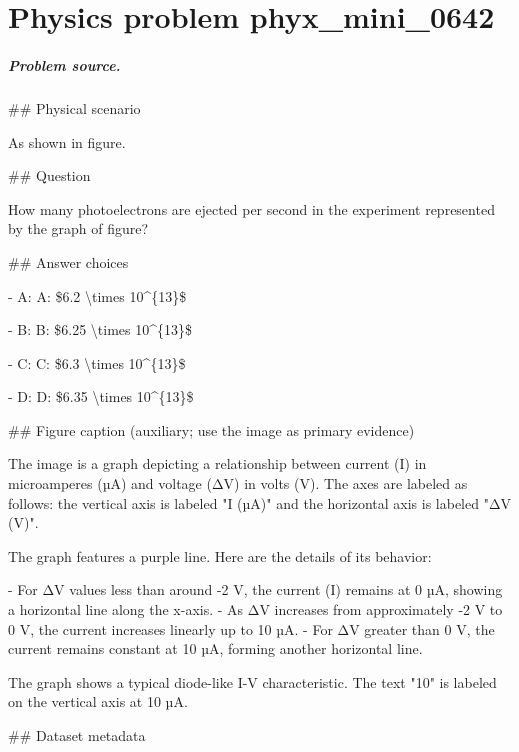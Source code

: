
\chapter{Physics problem phyx\_mini\_0642}
\label{ch:PhyXMiniProblems_problem_phyx_mini_0642}

\paragraph{Problem source.}
\#\# Physical scenario

As shown in figure.

\#\# Question

How many photoelectrons are ejected per second in the experiment represented by the graph of figure?

\#\# Answer choices

- A: A: \$6.2 \textbackslash{}times 10\textasciicircum{}\{13\}\$

- B: B: \$6.25 \textbackslash{}times 10\textasciicircum{}\{13\}\$

- C: C: \$6.3 \textbackslash{}times 10\textasciicircum{}\{13\}\$

- D: D: \$6.35 \textbackslash{}times 10\textasciicircum{}\{13\}\$

\#\# Figure caption (auxiliary; use the image as primary evidence)

The image is a graph depicting a relationship between current (I) in microamperes (µA) and voltage (ΔV) in volts (V). The axes are labeled as follows: the vertical axis is labeled "I (µA)" and the horizontal axis is labeled "ΔV (V)".

The graph features a purple line. Here are the details of its behavior:

- For ΔV values less than around -2 V, the current (I) remains at 0 µA, showing a horizontal line along the x-axis.
- As ΔV increases from approximately -2 V to 0 V, the current increases linearly up to 10 µA.
- For ΔV greater than 0 V, the current remains constant at 10 µA, forming another horizontal line.

The graph shows a typical diode-like I-V characteristic. The text "10" is labeled on the vertical axis at 10 µA.

\#\# Dataset metadata

